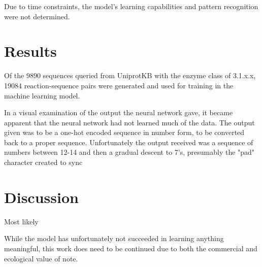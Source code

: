 \documentclass[12pt]{article}
\begin{document}
Due to time constraints, the model's learning capabilities and pattern recognition
were not determined.

\section{Results}
Of the 9890 sequences queried from UniprotKB with the enzyme class of 3.1.x.x, 19084
reaction-sequence pairs were generated and used for training in the machine learning
model. 

In a visual examination of the output the neural network gave, it became apparent that
the neural network had not learned much of the data. The output given was to be a
one-hot encoded sequence in number form, to be converted back to a proper sequence. Unfortunately
the output received was a sequence of numbers between 12-14 and then a gradual descent
to 7's, presumably the "pad" character created to sync 

\section{Discussion}
Most likely 

While the model has unfortunately not succeeded in learning anything meaningful, this work
does need to be continued due to both the commercial and ecological value of note.
\end{document}
